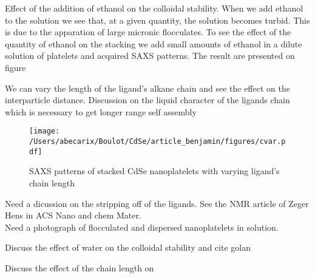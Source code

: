 \documentclass[journal = jacsat, manuscript=article, layout = twocolumn]{achemso}
\begin{document}
Effect of the addition of ethanol on the colloidal stability. When we add ethanol to the solution we see that, at a given quantity, the solution becomes turbid. This is due to the apparation of large micronic flocculates. To see the effect of the quantity of ethanol on the stacking we add small amounts of ethanol in a dilute solution of platelets and acquired SAXS patterns. The result are presented on figure %


We can vary the length of the ligand's alkane chain and see the effect on the interparticle distance. Discussion on the liquid character of the ligands chain which is necessary to get longer range self assembly \cite{Geyer:2012he}


\begin{figure}
\begin{center}
\texttt{[image: /Users/abecarix/Boulot/CdSe/article\_benjamin/figures/cvar.pdf]}
\caption{SAXS patterns of stacked CdSe nanoplatelets with varying ligand's chain length}
\end{center}
\end{figure}
Need a dicussion on the stripping off of the ligands. See the NMR article of Zeger Hens in ACS Nano and chem Mater.\\

Need a photograph of flocculated and dispersed nanoplatelets in solution.

Discuss the effect of water on the colloidal stability and cite golan

Discuss the effect of the chain length on


\end{document}
